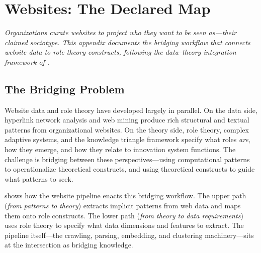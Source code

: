 \documentclass[../main.tex]{subfiles}
\begin{document}

\chapter{Websites: The Declared Map}
\label{app:websites}

\noindent\textit{Organizations curate websites to project who they want to be seen as---their claimed sociotype.
This appendix documents the bridging workflow that connects website data
to role theory constructs, following the data--theory integration framework
of \textcite{maass2018data}.}

\bigskip


\section{The Bridging Problem}

Website data and role theory have developed largely in parallel.
On the data side, hyperlink network analysis and web mining produce
rich structural and textual patterns from organizational websites.
On the theory side, role theory, complex adaptive systems, and the
knowledge triangle framework specify what roles \emph{are}, how they emerge,
and how they relate to innovation system functions.
The challenge is bridging between these perspectives---using
computational patterns to operationalize theoretical constructs, and using
theoretical constructs to guide what patterns to seek.

 shows how the \RoleBox{} website pipeline
enacts this bridging workflow.
The upper path (\textit{from patterns to theory}) extracts implicit
patterns from web data and maps them onto role constructs.
The lower path (\textit{from theory to data requirements}) uses role
theory to specify what data dimensions and features to extract.
The pipeline itself---the crawling, parsing, embedding, and
clustering machinery---sits at the intersection as bridging knowledge.
\end{document}
